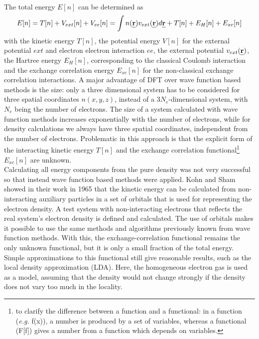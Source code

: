 \documentclass[11pt,DIV=13,BCOR=5mm,a4paper,headinclude]{scrbook}
\def\mathbi#1{\textbf{\em #1}}
\renewcommand{\vec}[1]{\mathbi{#1}}
\begin{document}
\\
The total energy $E[n]$ can be determined as
\begin{equation}
 E[n]=T[n] + V_{ext}[n] + V_{ee}[n]=\int n(\vec{r})v_{ext}(\vec{r})d\vec{r} + T[n]+E_H[n]+E_{xc}[n]
\end{equation}
with the kinetic energy $T[n]$, the potential energy $V[n]$ for the external potential $ext$ and electron electron interaction $ee$, the external potential $v_{ext}(\vec{r})$, the Hartree energy $E_H[n]$, corresponding to the classical Coulomb interaction and the exchange correlation energy $E_{xc}[n]$ for the non-classical exchange correlation interactions.
A major advantage of DFT over wave function based methods is the size: only a three dimensional system has to be considered for three spatial coordinates $n(x,y,z)$, instead of a $3N_e$-dimensional system, %
with $N_e$ being the number of electrons.
The size of a system calculated with wave function methods increases exponentially with the number of electrons, while for density calculations we always have three spatial coordinates, independent from the number of electrons.
Problematic in this approach is that the explicit form of the interacting kinetic energy $T[n]$ and the exchange correlation functional\footnote{to clarify the difference between a function and a functional: in a function (\textit{e.g.} f(x)), a number is produced by a set of variables, whereas a functional (F[f]) gives a number from a function which depends on variables.} $E_{xc}[n]$ are unknown.
\\
Calculating all energy components from the pure density was not very successful so that instead wave function based methods were applied.
Kohn and Sham showed in their work\cite{Kohn-Sham1965} in 1965 that the kinetic energy can be calculated from non-interacting auxiliary particles in a set of orbitals that is used for representing the electron density.
A test system with non-interacting electrons that reflects the real system's electron density is defined and calculated.
The use of orbitals makes it possible to use the same methods and algorithms previously known from wave function methods.
With this, the exchange-correlation functional remains the only unknown functional, but it is only a small fraction of the total energy.
Simple approximations to this functional still give reasonable results, such as the local density approximation (LDA).
Here, the homogeneous electron gas is used as a model, assuming that the density would not change strongly if the density does not vary too much in the locality.
\end{document}
